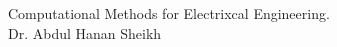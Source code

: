 \documentclass{article}
\begin{document}
     Computational Methods for Electrixcal Engineering. \\
     
     Dr. Abdul Hanan Sheikh
    
\end{document}
